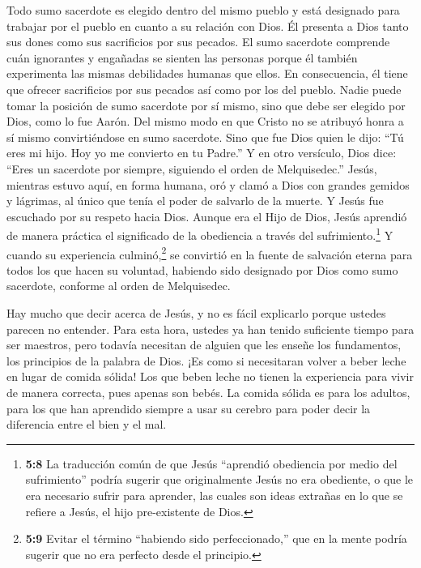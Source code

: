 Todo sumo sacerdote es elegido dentro del mismo pueblo y
está designado para trabajar por el pueblo en cuanto a su relación con
Dios. Él presenta a Dios tanto sus dones como sus sacrificios por sus
pecados.  El sumo sacerdote comprende cuán ignorantes y
engañadas se sienten las personas porque él también experimenta las
mismas debilidades humanas que ellos.  En consecuencia, él
tiene que ofrecer sacrificios por sus pecados así como por los del
pueblo.  Nadie puede tomar la posición de sumo sacerdote por
sí mismo, sino que debe ser elegido por Dios, como lo fue Aarón.
 Del mismo modo en que Cristo no se atribuyó honra a sí
mismo convirtiéndose en sumo sacerdote. Sino que fue Dios quien le dijo:
``Tú eres mi hijo. Hoy yo me convierto en tu Padre.''  Y en
otro versículo, Dios dice: ``Eres un sacerdote por siempre, siguiendo el
orden de Melquisedec.''  Jesús, mientras estuvo aquí, en
forma humana, oró y clamó a Dios con grandes gemidos y lágrimas, al
único que tenía el poder de salvarlo de la muerte. Y Jesús fue escuchado
por su respeto hacia Dios.  Aunque era el Hijo de Dios,
Jesús aprendió de manera práctica el significado de la obediencia a
través del sufrimiento.\footnote{\textbf{5:8} La traducción común de que
  Jesús ``aprendió obediencia por medio del sufrimiento'' podría sugerir
  que originalmente Jesús no era obediente, o que le era necesario
  sufrir para aprender, las cuales son ideas extrañas en lo que se
  refiere a Jesús, el hijo pre-existente de Dios.}  Y cuando
su experiencia culminó,\footnote{\textbf{5:9} Evitar el término
  ``habiendo sido perfeccionado,'' que en la mente podría sugerir que no
  era perfecto desde el principio.} se convirtió en la fuente de
salvación eterna para todos los que hacen su voluntad, 
habiendo sido designado por Dios como sumo sacerdote, conforme al orden
de Melquisedec.

 Hay mucho que decir acerca de Jesús, y no es fácil
explicarlo porque ustedes parecen no entender.  Para esta
hora, ustedes ya han tenido suficiente tiempo para ser maestros, pero
todavía necesitan de alguien que les enseñe los fundamentos, los
principios de la palabra de Dios. ¡Es como si necesitaran volver a beber
leche en lugar de comida sólida!  Los que beben leche no
tienen la experiencia para vivir de manera correcta, pues apenas son
bebés.  La comida sólida es para los adultos, para los que
han aprendido siempre a usar su cerebro para poder decir la diferencia
entre el bien y el mal.

